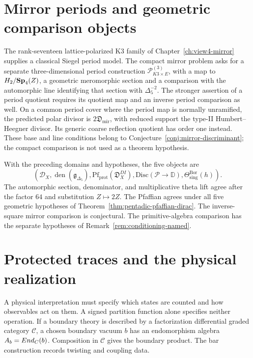 \section{Mirror periods and geometric comparison objects}
\label{sec:view-4-mirror}

The rank-seventeen lattice-polarized K3 family of
Chapter~\ref{ch:view4-mirror} supplies a classical Siegel period
model. The compact mirror problem asks for a separate
three-dimensional period construction \(\mathcal P_{K3\times E}^{(3)}\),
with a map to \(H_2/\mathbf{Sp}_4(Z)\), a geometric meromorphic
section and a comparison with the automorphic line identifying
that section with \(\Delta_5^{-2}\). The stronger assertion of a
period quotient requires its quotient map and an inverse period
comparison as well.
On a common period cover where the period map is normally
unramified, the predicted polar divisor is
\(2\mathfrak D_{\mathrm{mir}}\), with reduced support the type-II
Humbert--Heegner divisor. Its generic coarse reflection quotient
has order one instead. These base and line conditions belong to
Conjecture~\ref{conj:mirror-discriminant}; the compact comparison
is not used as a theorem hypothesis.

\begin{definition}
\label{def:pentadic-delta5}
With the preceding domains and hypotheses, the five objects are
\[
 (\mathcal D_X,\operatorname{den}(\mathfrak g_{\Delta_5}),
 \mathrm{Pf}_{\mathrm{prot}}(\mathfrak D_X^{DI}),
 \mathrm{Disc}(\mathcal P\to\mathbb D),
 \Theta_{\mathrm{sing}}^{\mathrm{Bor}}(h)).
\]
The automorphic section, denominator, and multiplicative theta lift
agree after the factor \(64\) and substitution \(Z\mapsto2Z\).
The Pfaffian agrees under all five geometric hypotheses of
Theorem~\ref{thm:pentadic-pfaffian-dirac}. The inverse-square mirror
comparison is conjectural. The primitive-algebra comparison has the
separate hypotheses of Remark~\ref{rem:conditioning-named}.
\end{definition}

\section{Protected traces and the physical realization}
\label{sec:beilinson-chain-placement}

A physical interpretation must specify which states are counted
and how observables act on them. A signed partition function alone
specifies neither operation. If a boundary theory is described by
a factorization differential graded category \(\mathcal C\), a
chosen boundary vacuum \(b\) has an endomorphism algebra
\(A_b=End_{C}(b)\). Composition in \(\mathcal C\)
gives the boundary product. The bar construction records twisting
and coupling data.


